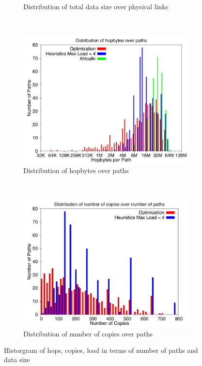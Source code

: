 \begin{figure}[!htbp]
\begin{subfigure}[b]{0.49\textwidth}
                \caption{Distribution of total data size over physical links}
                \label{fig:27_512_loaddata}
        \end{subfigure}
        ~ %
        \begin{subfigure}[b]{0.49\textwidth}
                \includegraphics[width=\textwidth]{report_figures/constantr/27_512/hopbyte_histo.pdf}
                \caption{Distribution of hopbytes over paths}
                \label{fig:27_512_hopbyte}
        \end{subfigure}
        ~ %
        \begin{subfigure}[b]{0.49\textwidth}
                \includegraphics[width=\textwidth]{report_figures/constantr/27_512/hopcopy_histo.pdf}
                \caption{Distribution of number of copies over paths}
                \label{fig:27_512_hopcopy}
        \end{subfigure}
        \caption{Historgram of hops, copies, load in terms of number of paths and data size}
        \label{fig:27_512_histo}
\end{figure}

